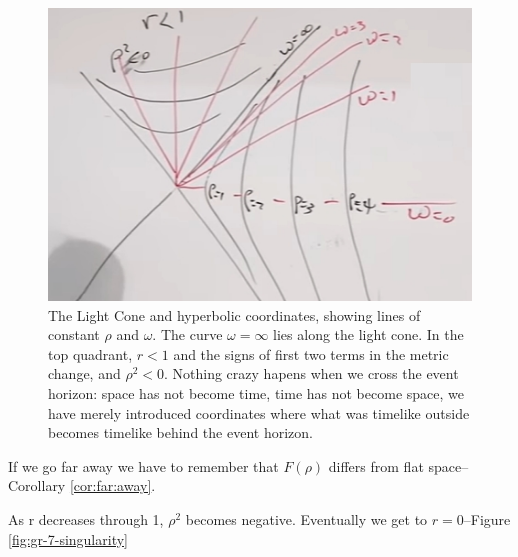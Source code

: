 \documentclass[]{article}
\begin{document}
{\begin{figure}[H]
	\begin{center}
		\caption[The Light Cone and hyperbolic coordinates]{The Light Cone and hyperbolic coordinates, showing lines of constant $\rho$ and $\omega$. The curve $\omega=\infty$ lies along the light cone. In the top quadrant,  $r<1$ and the signs of first two terms in the metric change, and $\rho^2<0$. Nothing crazy hapens when we cross the event horizon: space has not become time, time has not become space, we have merely introduced coordinates where what was timelike outside becomes timelike behind the event horizon.}\label{fig:gr-7-flat-space-hyperbolic-coordinates}
		\includegraphics[width=\textwidth]{gr-7-flat-space-hyperbolic-coordinates}
	\end{center}
\end{figure}

If we go far away we have to remember that $F(\rho)$ differs from flat space--Corollary \ref{cor:far:away}.

As r decreases through 1, $\rho^2$ becomes negative. Eventually we get to $r=0$--Figure \ref{fig:gr-7-singularity}

}
\end{document}
